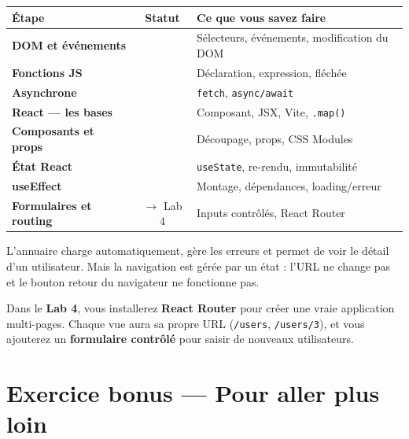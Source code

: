 \documentclass[11pt,a4paper]{article}
\newcommand{\cmark}{\ding{51}}
\begin{document}
\begin{center}
\begin{tabular}{lcp{7cm}}
\toprule
\textbf{Étape} & \textbf{Statut} & \textbf{Ce que vous savez faire} \\
\midrule
\textbf{DOM et événements} & \cmark{} & Sélecteurs, événements, modification du DOM \\
\textbf{Fonctions JS} & \cmark{} & Déclaration, expression, fléchée \\
\textbf{Asynchrone} & \cmark{} & \texttt{fetch}, \texttt{async/await} \\
\textbf{React --- les bases} & \cmark{} & Composant, JSX, Vite, \texttt{.map()} \\
\textbf{Composants et props} & \cmark{} & Découpage, props, CSS Modules \\
\textbf{État React} & \cmark{} & \texttt{useState}, re-rendu, immutabilité \\
\textbf{useEffect} & \cmark{} & Montage, dépendances, loading/erreur \\
\textbf{Formulaires et routing} & $\to$ Lab 4 & Inputs contrôlés, React Router \\
\bottomrule
\end{tabular}
\end{center}

\begin{projetbox}[Et ensuite ?]
L'annuaire charge automatiquement, gère les erreurs et permet de voir le détail d'un utilisateur. Mais la navigation est gérée par un état : l'URL ne change pas et le bouton retour du navigateur ne fonctionne pas.

Dans le \textbf{Lab 4}, vous installerez \textbf{React Router} pour créer une vraie application multi-pages. Chaque vue aura sa propre URL (\texttt{/users}, \texttt{/users/3}), et vous ajouterez un \textbf{formulaire contrôlé} pour saisir de nouveaux utilisateurs.
\end{projetbox}

\section*{Exercice bonus --- Pour aller plus loin}
\end{document}
